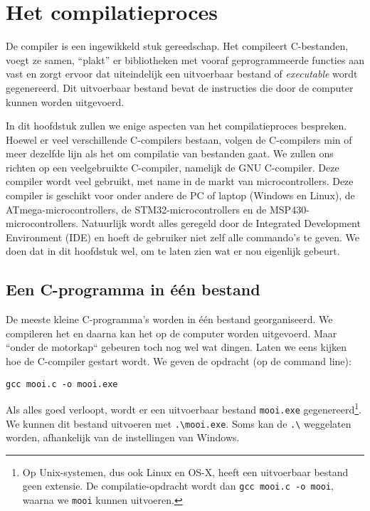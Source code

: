 \chapter{Het compilatieproces}
\label{cha:compilatieproces}
\thispagestyle{empty}

De compiler is een ingewikkeld stuk gereedschap. Het compileert C-bestanden, voegt ze samen, ``plakt'' er bibliotheken met vooraf geprogrammeerde functies aan vast en zorgt ervoor dat uiteindelijk een uitvoerbaar bestand of \textsl{executable} wordt gegenereerd. Dit uitvoerbaar bestand bevat de instructies die door de computer kunnen worden uitgevoerd.

In dit hoofdstuk zullen we enige aspecten van het compilatieproces bespreken. Hoewel er veel verschillende C-compilers bestaan, volgen de C-compilers min of meer dezelfde lijn als het om compilatie van bestanden gaat. We zullen ons richten op een veelgebruikte C-compiler, namelijk de GNU C-compiler. Deze compiler wordt veel gebruikt, met name in de markt van microcontrollers. Deze compiler is geschikt voor onder andere de PC of laptop (Windows en Linux), de ATmega-microcontrollers, de STM32-microcontrollers en de MSP430-microcontrollers. Natuurlijk wordt alles geregeld door de Integrated Development Environment (IDE) en hoeft de gebruiker niet zelf alle commando's te geven. We doen dat in dit hoofdstuk wel, om te laten zien wat er nou eigenlijk gebeurt.


\section{Een C-programma in één bestand}
De meeste kleine C-programma's worden in één bestand georganiseerd. We compileren het en daarna kan het op de computer worden uitgevoerd. Maar ``onder de motorkap`` gebeuren toch nog wel wat dingen. Laten we eens kijken hoe de C-compiler gestart wordt. We geven de opdracht (op de command line):

\hspace*{1em}\texttt{gcc mooi.c -o mooi.exe}

Als alles goed verloopt, wordt er een uitvoerbaar bestand \texttt{mooi.exe} gegenereerd\footnote{Op Unix-systemen, dus ook Linux en OS-X, heeft een uitvoerbaar bestand geen extensie. De compilatie-opdracht wordt dan \texttt{gcc mooi.c -o mooi}, waarna we \texttt{mooi} kunnen uitvoeren.}. We kunnen dit bestand uitvoeren met \texttt{.\textbackslash mooi.exe}. Soms kan de \texttt{.\textbackslash} weggelaten worden, afhankelijk van de instellingen van Windows.


